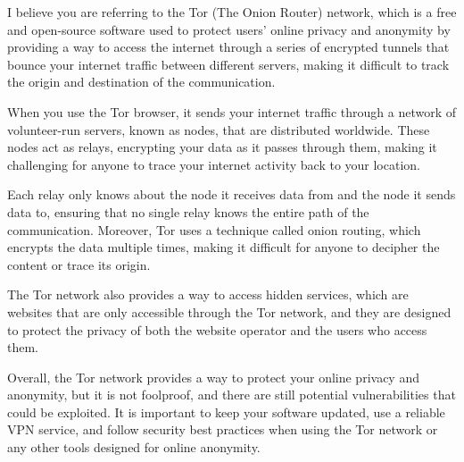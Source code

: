 I believe you are referring to the Tor (The Onion Router) network, which is a free and open-source software used to protect users' online privacy and anonymity by providing a way to access the internet through a series of encrypted tunnels that bounce your internet traffic between different servers, making it difficult to track the origin and destination of the communication.

When you use the Tor browser, it sends your internet traffic through a network of volunteer-run servers, known as nodes, that are distributed worldwide. These nodes act as relays, encrypting your data as it passes through them, making it challenging for anyone to trace your internet activity back to your location.

Each relay only knows about the node it receives data from and the node it sends data to, ensuring that no single relay knows the entire path of the communication. Moreover, Tor uses a technique called onion routing, which encrypts the data multiple times, making it difficult for anyone to decipher the content or trace its origin.

The Tor network also provides a way to access hidden services, which are websites that are only accessible through the Tor network, and they are designed to protect the privacy of both the website operator and the users who access them.

Overall, the Tor network provides a way to protect your online privacy and anonymity, but it is not foolproof, and there are still potential vulnerabilities that could be exploited. It is important to keep your software updated, use a reliable VPN service, and follow security best practices when using the Tor network or any other tools designed for online anonymity.

